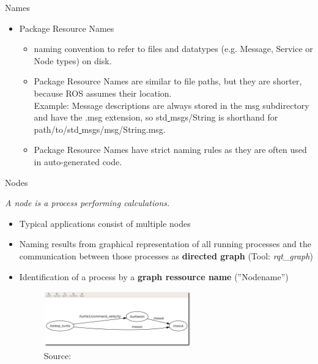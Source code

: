 \documentclass{beamer}
\begin{document}
\begin{frame}{Names}
	\begin{itemize}
		\item Package Resource Names
		
		\begin{itemize}
			\item naming convention to refer to files and datatypes (e.g. Message, Service or Node types) on disk. 
			\item Package Resource Names are similar to file paths, but they are shorter, because ROS assumes their location. \\
			Example: Message descriptions are always stored in the msg subdirectory and have the .msg extension, so std\underline{ }msgs/String is shorthand for path/to/std\underline{ }msgs/msg/String.msg.
			\item Package Resource Names have strict naming rules as they are often used in auto-generated code. 
		\end{itemize}
		
	\end{itemize}
		
\end{frame}

\begin{frame}{Nodes}
	\begin{definition}[Node]
		\textit{A node is a process performing calculations.}
	\end{definition}
	
	\begin{itemize}
		\item Typical applications consist of multiple nodes
		\item Naming results from graphical representation of all running processes and the communication between those processes as \textbf{directed graph} (Tool: \textit{rqt\_graph})
		\item Identification of a process by a \textbf{graph ressource name} (''Nodename'')
		\begin{figure}[H]
			\centering
			\includegraphics[width=0.6\textwidth]{./images/rxgraph-turtle-key.png}
			\caption{Source: \cite{ROS:2015:Online}}
			\label{fig:ros_graph}
		\end{figure}
	\end{itemize}
\end{frame}
\end{document}
